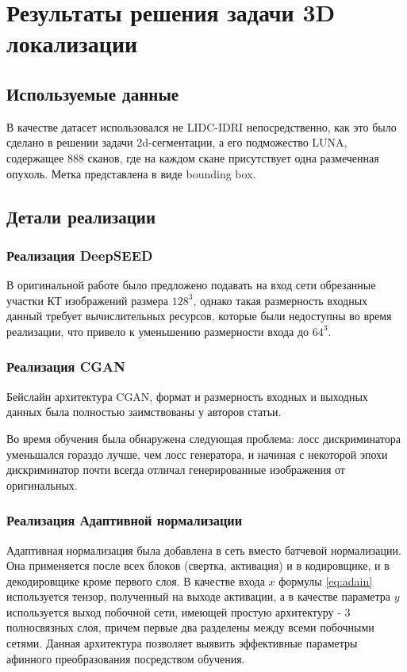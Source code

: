 \chapter{Результаты решения задачи 3D локализации}

\section{Используемые данные}

В качестве датасет использовался не LIDC-IDRI непосредственно, как это было сделано в решении задачи 2d-сегментации, а его подможество LUNA, содержащее 888 сканов, где на каждом скане присутствует одна размеченная опухоль. Метка представлена в виде bounding box.

\section{Детали реализации}

\subsection{Реализация DeepSEED}

В оригинальной работе было предложено подавать на вход сети обрезанные участки КТ изображений размера $128^3$, однако такая размерность входных данный требует вычислительных ресурсов, которые были недоступны во время реализации, что привело к уменьшению размерности входа до $64^3$.

\subsection{Реализация CGAN}

Бейслайн архитектура CGAN, формат и размерность входных и выходных данных была полностью заимствованы у авторов статьи.

Во время обучения была обнаружена следующая проблема: лосс дискриминатора уменьшался гораздо лучше, чем лосс генератора, и начиная с некоторой эпохи дискриминатор почти всегда отличал генерированные изображения от оригинальных.

\subsection{Реализация Адаптивной нормализации}

Адаптивная нормализация была добавлена в сеть вместо батчевой нормализации. Она применяется после всех блоков (свертка, активация) и в кодировщике, и в декодировщике кроме первого слоя. В качестве входа $x$ формулы \eqref{eq:adain} используется тензор, полученный на выходе активации, а в качестве параметра $y$ используется выход побочной сети, имеющей простую архитектуру - 3 полносвязных слоя, причем первые два разделены между всеми побочными сетями. Данная архитектура позволяет выявить эффективные параметры афинного преобразования посредством обучения.

